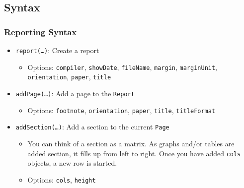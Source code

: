 \documentclass[10pt]{beamer}
\begin{document}
\subsection{Syntax}
\begin{frame}
  \frametitle{Reporting Syntax}
  \begin{itemize}
  \item \texttt{report(\ldots)}: Create a report
    \begin{itemize}
    \item Options: \texttt{compiler}, \texttt{showDate}, \texttt{fileName}, \texttt{margin}, \texttt{marginUnit}, \texttt{orientation}, \texttt{paper}, \texttt{title}
    \end{itemize}
  \item \texttt{addPage(\ldots)}: Add a page to the \texttt{Report}
    \begin{itemize}
    \item Options: \texttt{footnote}, \texttt{orientation}, \texttt{paper}, \texttt{title}, \texttt{titleFormat}
    \end{itemize}
  \item \texttt{addSection(\ldots)}: Add a section to the current \texttt{Page}
    \begin{itemize}
    \item You can think of a section as a matrix. As graphs and/or tables are added section, it fills up from left to right. Once you have added \texttt{cols} objects, a new row is started.
    \item Options: \texttt{cols}, \texttt{height}
    \end{itemize}
  \end{itemize}
\end{frame}
\end{document}
